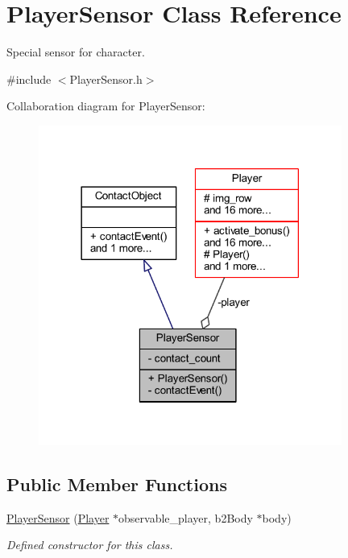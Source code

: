\hypertarget{class_player_sensor}{}\section{Player\+Sensor Class Reference}
\label{class_player_sensor}


Special sensor for character.  




{\ttfamily \#include $<$Player\+Sensor.\+h$>$}



Collaboration diagram for Player\+Sensor\+:
\nopagebreak
\begin{figure}[H]
\begin{center}
\leavevmode
\includegraphics[width=282pt]{class_player_sensor__coll__graph}
\end{center}
\end{figure}
\subsection*{Public Member Functions}
\begin{DoxyCompactItemize}
\item 
\hyperlink{class_player_sensor_a1e74f6ad656f4cdc6449fc55b41dff42}{Player\+Sensor} (\hyperlink{class_player}{Player} $\ast$observable\+\_\+player, b2\+Body $\ast$body)
\begin{DoxyCompactList}\small\item\em Defined constructor for this class. \end{DoxyCompactList}\end{DoxyCompactItemize}
